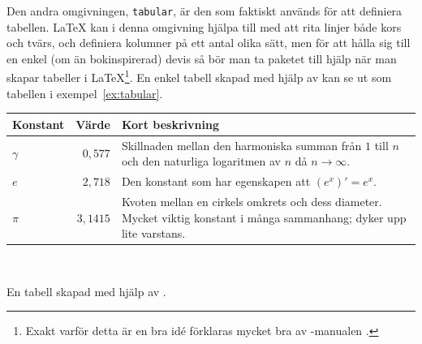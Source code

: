 \documentclass[../../latex.tex]{subfiles}
\begin{document}
Den andra omgivningen, \texttt{tabular}, är den som faktiskt används för
att definiera tabellen. \LaTeX{} kan i denna omgivning hjälpa till med att
rita linjer både kors och tvärs, och definiera kolumner på ett antal olika
sätt, men för att hålla sig till en enkel (om än bokinspirerad) devis så
bör man ta paketet  till hjälp när man skapar tabeller i
\LaTeX\footnote{Exakt varför detta är en bra idé förklaras mycket bra av
-manualen \cite{Fear05}.}.
En enkel tabell skapad med hjälp av  kan se ut som
tabellen i exempel~\vref{ex:tabular}.

\begin{kod}[tbp]
	\centering 
	\begin{minipage}{0.9\textwidth} %
		\begin{latexcode}
\begin{tabular}{l r p{4cm}}
\toprule 
Konstant & Värde & Kort beskrivning \\
\midrule 
\(\gamma\) & \(0,577\) & Skillnaden mellan den
 harmoniska summan från \(1\) till \(n\) och den
 naturliga logaritmen av \(n\) då \(n\to\infty\).\\
\(e\) & \(2,718\) & Den konstant som har
egenskapen att \((e^x)' = e^x\). \\
\(\pi\) & \(3,1415\) & Kvoten mellan en cirkels
 omkrets och dess diameter. Mycket viktig
 konstant i många sammanhang; dyker upp
 lite varstans. \\
\bottomrule
\end{tabular}
		\end{latexcode}
	\end{minipage}
	\\ \medskip
	\caption{En tabell skapad med hjälp av .}
	\label{ex:tabular}
\end{kod}
\end{document}
